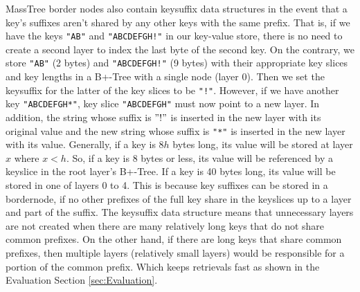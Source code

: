MassTree border nodes also contain keysuffix data structures in the event that a key's suffixes aren't shared by any other keys with the same prefix. That is, if we have the keys \texttt{"AB"} and \texttt{"ABCDEFGH!"} in our key-value store, there is no need to create a second layer to index the last byte of the second key. On the contrary, we store \texttt{"AB"} (2 bytes) and \texttt{"ABCDEFGH!"} (9 bytes) with their appropriate key slices and key lengths in a B+-Tree with a single node (layer 0). Then we set the keysuffix for the latter of the key slices to be \texttt{"!"}. However, if we have another key \texttt{"ABCDEFGH*"}, key slice \texttt{"ABCDEFGH"} must now point to a new layer. In addition, the string whose suffix is $"!"$ is inserted in the new layer with its original value and the new string whose suffix is \texttt{"*"} is inserted in the new layer with its value. Generally, if a key is $8h$ bytes long, its value will be stored at layer $x$ where $x < h$. So, if a key is 8 bytes or less, its value will be referenced by a keyslice in the root layer's B+-Tree. If a key is 40 bytes long, its value will be stored in one of layers 0 to 4. This is because key suffixes can be stored in a bordernode, if no other prefixes of the full key share in the keyslices up to a layer and part of the suffix. The keysuffix data structure means that unnecessary layers are not created when there are many relatively long keys that do not share common prefixes. On the other hand, if there are long keys that share common prefixes, then multiple layers (relatively small layers) would be responsible for a portion of the common prefix. Which keeps retrievals fast as shown in the Evaluation Section \ref{sec:Evaluation}.

